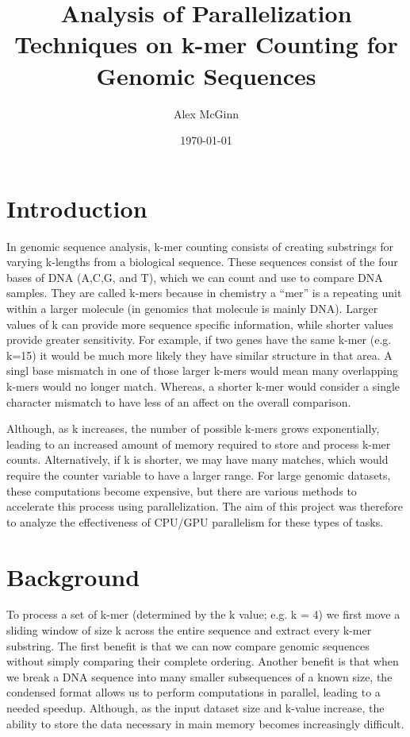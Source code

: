 \documentclass{article}
\title{Analysis of Parallelization Techniques on k-mer Counting for Genomic Sequences}
\author{Alex McGinn}
\date{\today}
\begin{document}
\maketitle

\section{Introduction}

In genomic sequence analysis, k-mer counting consists of creating substrings for varying k-lengths from a  
biological sequence. These sequences consist of the four bases of DNA (A,C,G, and T), which we can count  
and use to compare DNA samples. They are called k-mers because in chemistry a ``mer'' is a repeating unit  
within a larger molecule (in genomics that molecule is mainly DNA). Larger values of k can provide more  
sequence specific information, while shorter values provide greater sensitivity\cite{lees2016seer}. For example, 
if two genes have the same k-mer (e.g. k=15) it would be much more likely they have similar structure in that area. A singl base 
mismatch in one of those larger k-mers would mean many overlapping k-mers would no longer match. Whereas, a shorter k-mer would consider 
a single character mismatch to have less of an affect on the overall comparison.

\vspace{\baselineskip}

Although, as k increases, the number of possible k-mers grows exponentially, leading to an increased amount of memory required to 
store and process k-mer counts. Alternatively, if k is shorter, we may have many matches, which would require the counter variable to 
have a larger range. 
For large genomic datasets, these computations become expensive, but there are various methods to accelerate this 
process using parallelization. The aim of this project was therefore to analyze the effectiveness of CPU/GPU parallelism for these  
types of tasks.

\section{Background}

To process a set of k-mer (determined by the k value; e.g. k = 4) we first move a sliding window of size k across the entire sequence and extract every k-mer substring.  
The first benefit is that we can now compare genomic sequences without simply comparing their complete ordering. Another benefit is that when we 
break a DNA sequence into many smaller subsequences of a known size, the condensed format allows us to perform computations in parallel, 
leading to a needed speedup. Although, as the input dataset size and k-value increase, the ability to store the data necessary in main memory becomes 
increasingly difficult.  
\end{document}
